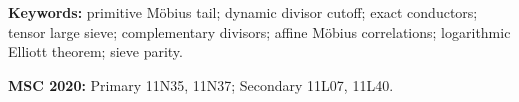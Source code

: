 \documentclass[11pt]{article}
\theoremstyle{definition}
\theoremstyle{remark}
\begin{document}
\noindent\textbf{Keywords:} primitive M\"obius tail; dynamic divisor
cutoff; exact conductors; tensor large sieve; complementary divisors;
affine M\"obius correlations; logarithmic Elliott theorem; sieve parity.

\medskip
\noindent\textbf{MSC 2020:} Primary 11N35, 11N37; Secondary
11L07, 11L40.











\clearpage
\begingroup
\footnotesize


\endgroup
\end{document}

